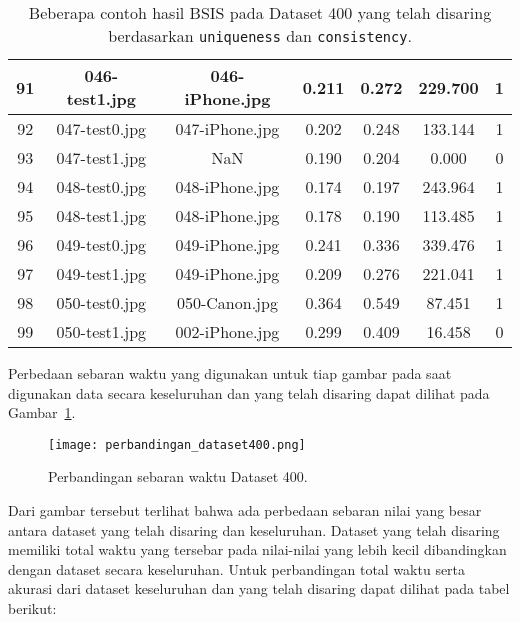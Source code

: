\begin{table}[H]
\begin{tabular}{|c|c|c|c|c|c|c|}
		\hline
		91  & 046-test1.jpg    & 046-iPhone.jpg   & 0.211                 & 0.272                & 229.700                & 1                  \\ 
		\hline
		92  & 047-test0.jpg    & 047-iPhone.jpg   & 0.202                 & 0.248                & 133.144                & 1                  \\ 
		\hline
		93  & 047-test1.jpg    & NaN              & 0.190                 & 0.204                & 0.000                  & 0                  \\ 
		\hline
		94  & 048-test0.jpg    & 048-iPhone.jpg   & 0.174                 & 0.197                & 243.964                & 1                  \\ 
		\hline
		95  & 048-test1.jpg    & 048-iPhone.jpg   & 0.178                 & 0.190                & 113.485                & 1                  \\ 
		\hline
		96  & 049-test0.jpg    & 049-iPhone.jpg   & 0.241                 & 0.336                & 339.476                & 1                  \\ 
		\hline
		97  & 049-test1.jpg    & 049-iPhone.jpg   & 0.209                 & 0.276                & 221.041                & 1                  \\ 
		\hline
		98  & 050-test0.jpg    & 050-Canon.jpg    & 0.364                 & 0.549                & 87.451                 & 1                  \\ 
		\hline
		99  & 050-test1.jpg    & 002-iPhone.jpg   & 0.299                 & 0.409                & 16.458                 & 0                  \\
		\hline
	\end{tabular}
	\caption{Beberapa contoh hasil BSIS pada Dataset 400 yang telah disaring berdasarkan \texttt{uniqueness} dan \texttt{consistency}.}
	\label{tab:result_filtered_400}
\end{table}
Perbedaan sebaran waktu yang digunakan untuk tiap gambar pada saat digunakan data secara keseluruhan dan yang telah disaring dapat dilihat pada Gambar~\ref{fig:perbandingan_dataset400}.
\begin{figure}[H]
	\centering
	\texttt{[image: perbandingan\_dataset400.png]}
	\caption{Perbandingan sebaran waktu Dataset 400.}
	\label{fig:perbandingan_dataset400}
\end{figure}
Dari gambar tersebut terlihat bahwa ada perbedaan sebaran nilai yang besar antara dataset yang telah disaring dan keseluruhan. Dataset yang telah disaring memiliki total waktu yang tersebar pada nilai-nilai yang lebih kecil dibandingkan dengan dataset secara keseluruhan. Untuk perbandingan total waktu serta akurasi dari dataset keseluruhan dan yang telah disaring dapat dilihat pada tabel berikut:

